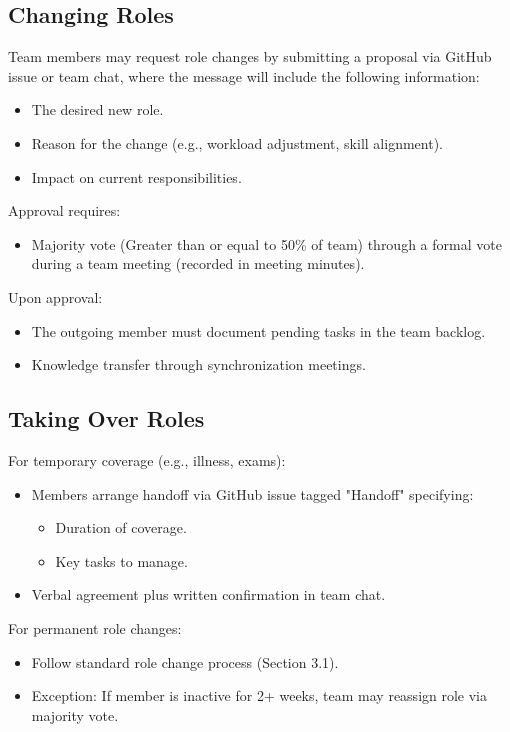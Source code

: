 \documentclass[12pt, titlepage]{article}
\begin{document}
\subsection{Changing Roles}
Team members may request role changes by submitting a proposal via GitHub issue or team chat, where the message will include the following information:
\begin{itemize}
    \item The desired new role.
    \item Reason for the change (e.g., workload adjustment, skill alignment).
    \item Impact on current responsibilities.
\end{itemize}
Approval requires:
\begin{itemize}
    \item Majority vote (Greater than or equal to 50\% of team) through a formal vote during a team meeting (recorded in meeting minutes).
\end{itemize}
Upon approval:
\begin{itemize}
    \item The outgoing member must document pending tasks in the team backlog.
    \item Knowledge transfer through synchronization meetings.
\end{itemize}

\subsection{Taking Over Roles}
For temporary coverage (e.g., illness, exams):
\begin{itemize}
    \item Members arrange handoff via GitHub issue tagged "Handoff" specifying:
    \begin{itemize}
        \item Duration of coverage.
        \item Key tasks to manage.
    \end{itemize}
    \item Verbal agreement plus written confirmation in team chat.
\end{itemize}
For permanent role changes:
\begin{itemize}
    \item Follow standard role change process (Section 3.1).
    \item Exception: If member is inactive for 2+ weeks, team may reassign role via majority vote.
\end{itemize}
\end{document}
